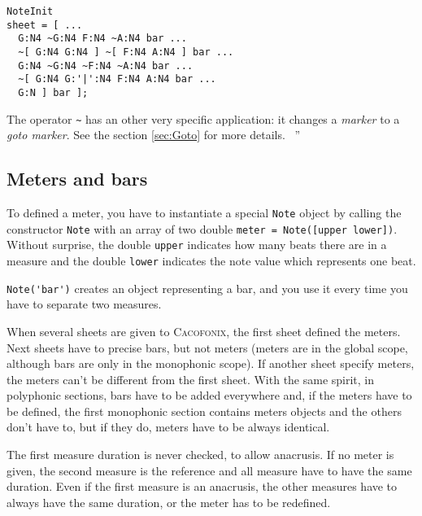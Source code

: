 \documentclass{article}
\newcommand{\cacofonix}{\textsc{Cacofonix}\xspace}
\newcommand{\note}{\lstinline!Note!\xspace}
\newenvironment{meenv}{ \par \noindent \makebox[6em][r]{ \textcolor{mecolor}{Me}: `` --~}}{~''}
\begin{document}
\begin{lstlisting}
NoteInit
sheet = [ ...
  G:N4 ~G:N4 F:N4 ~A:N4 bar ...
  ~[ G:N4 G:N4 ] ~[ F:N4 A:N4 ] bar ...
  G:N4 ~G:N4 ~F:N4 ~A:N4 bar ...
  ~[ G:N4 G:'|':N4 F:N4 A:N4 bar ...
  G:N ] bar ];
\end{lstlisting}

\begin{meenv}%
The operator \lstinline!~! has an other very specific application: it changes a \emph{marker} to a \emph{goto marker}. See the section \ref{sec:Goto} for more details.%
\end{meenv}

\subsection{Meters and bars}
\label{sec:MetersAndBars}

To defined a meter, you have to instantiate a special \note object by calling the constructor \note with an array of two double \lstinline!meter = Note([upper lower])!. Without surprise, the double \lstinline!upper! indicates how many beats there are in a measure and the double \lstinline!lower! indicates the note value which represents one beat.

\lstinline!Note('bar')! creates an object representing a bar, and you use it every time you have to separate two measures.

When several sheets are given to \cacofonix, the first sheet defined the meters. Next sheets have to precise bars, but not meters (meters are in the global scope, although bars are only in the monophonic scope). If another sheet specify meters, the meters can't be different from the first sheet. With the same spirit, in polyphonic sections, bars have to be added everywhere and, if the meters have to be defined, the first monophonic section contains meters objects and the others don't have to, but if they do, meters have to be always identical.

The first measure duration is never checked, to allow anacrusis. If no meter is given, the second measure is the reference and all measure have to have the same duration. Even if the first measure is an anacrusis, the other measures have to always have the same duration, or the meter has to be redefined.

\end{document}
